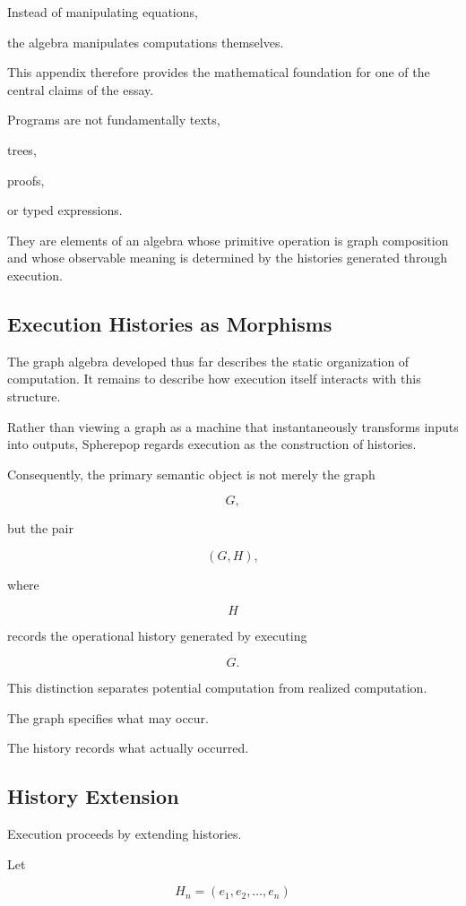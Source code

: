 \documentclass[12pt,oneside]{article}
\begin{document}
Instead of manipulating equations,

the algebra manipulates computations themselves.

This appendix therefore provides the mathematical foundation for one of the central claims of the essay.

Programs are not fundamentally texts,

trees,

proofs,

or typed expressions.

They are elements of an algebra whose primitive operation is graph composition and whose observable meaning is determined by the histories generated through execution.

\subsection{Execution Histories as Morphisms}

The graph algebra developed thus far describes the static organization of computation. It remains to describe how execution itself interacts with this structure.

Rather than viewing a graph as a machine that instantaneously transforms inputs into outputs, Spherepop regards execution as the construction of histories.

Consequently, the primary semantic object is not merely the graph

\[
G,
\]

but the pair

\[
(G,H),
\]

where

\[
H
\]

records the operational history generated by executing

\[
G.
\]

This distinction separates potential computation from realized computation.

The graph specifies what may occur.

The history records what actually occurred.

\subsection{History Extension}

Execution proceeds by extending histories.

Let

\[
H_n
=
(e_1,e_2,\ldots,e_n)
\]
\end{document}
